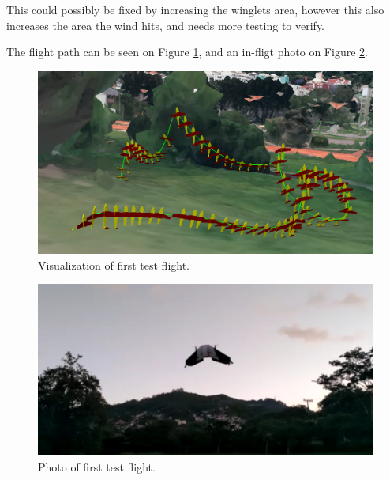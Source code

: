 This could possibly be fixed by increasing the winglets area, however this also increases the area the wind hits, and needs more testing to verify.
%

The flight path can be seen on Figure \ref{fig:flight1-3d}, and an in-fligt photo on Figure \ref{fig:flight1-photo}.
	
\begin{figure}[H]
\centering
  \includegraphics[width=0.7\linewidth]{figs/flight1-3d.png}
  \caption{Visualization of first test flight.}
  \label{fig:flight1-3d}
\end{figure}
	
	\begin{figure}[H]
\centering
  \includegraphics[width=0.7\linewidth]{figs/flight1-photo.png}
  \caption{Photo of first test flight.}
  \label{fig:flight1-photo}
\end{figure}
	






